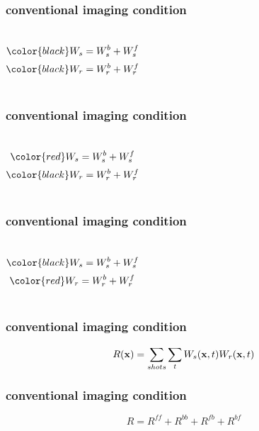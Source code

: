 \begin{frame}  \frametitle{conventional imaging condition}

\begin{columns}
\vspace{0.2in}
\[
\color{black} \US= \USr + \USt
\]
\vspace{0.3in}
\[
\color{black} \UR= \URr + \URt
\]
\end{columns}

\end{frame}



\begin{frame} \frametitle{conventional imaging condition}
\begin{columns}
\vspace{0.2in}
\[
\color{red} \US= \USr + \USt
\]
\vspace{0.3in}
\[
\color{black} \UR= \URr + \URt
\]
\end{columns}

\end{frame}



\begin{frame}  \frametitle{conventional imaging condition}

\begin{columns}
\vspace{0.2in}
\[
\color{black} \US= \USr + \USt
\]
\vspace{0.3in}
\[
\color{red} \UR= \URr + \URt
\]
\end{columns}

\end{frame}

\begin{frame} \frametitle{conventional imaging condition}
 \[
    R({\bf x})= \sum_{shots} \sum_{t} {W_s}({\bf x},t) {W_r}({\bf x},t)
 \]
\end{frame}

\begin{frame} \frametitle{conventional imaging condition}
 \[
    R = { R^{ff}} + {R^{bb}} + {R^{fb}}+ {R^{bf}}
 \]
\end{frame}

